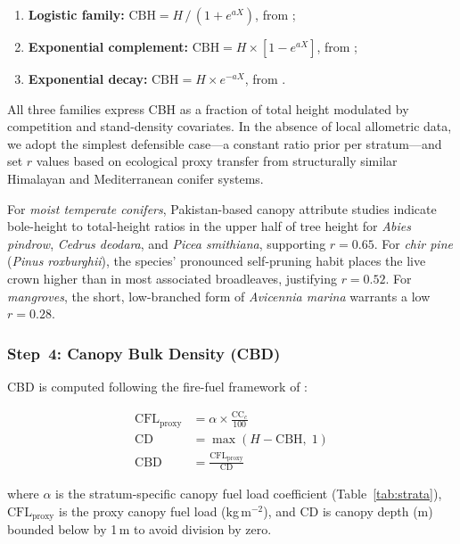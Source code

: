 \documentclass[12pt,a4paper,twoside]{article}
\newcommand{\CCc}{\text{CC}_{c}}
\newcommand{\CBH}{\text{CBH}}
\newcommand{\CBD}{\text{CBD}}
\newcommand{\CFL}{\text{CFL}}
\newcommand{\CD}{\text{CD}}
\begin{document}
\begin{enumerate}[nosep]
  \item \textbf{Logistic family:} $\CBH = H \,/\, (1 + e^{aX})$, from
    \citet{Ritchie1987};
  \item \textbf{Exponential complement:} $\CBH = H \times [1 - e^{aX}]$, from
    \citet{Wykoff1982};
  \item \textbf{Exponential decay:} $\CBH = H \times e^{-aX}$, from
    \citet{Soares2001}.
\end{enumerate}

All three families express CBH as a fraction of total height modulated by
competition and stand-density covariates.  In the absence of local allometric data,
we adopt the simplest defensible case---a constant ratio prior per stratum---and
set $r$ values based on ecological proxy transfer from structurally similar
Himalayan and Mediterranean conifer systems.

For \textit{moist temperate conifers}, Pakistan-based canopy attribute studies
\citep{AliPFI2017} indicate bole-height to total-height ratios in the upper half
of tree height for \textit{Abies pindrow}, \textit{Cedrus deodara}, and
\textit{Picea smithiana}, supporting $r = 0.65$.  For \textit{chir pine}
(\textit{Pinus roxburghii}), the species' pronounced self-pruning habit places
the live crown higher than in most associated broadleaves, justifying $r = 0.52$.
For \textit{mangroves}, the short, low-branched form of \textit{Avicennia marina}
warrants a low $r = 0.28$.

\subsubsection{Step~4: Canopy Bulk Density (CBD)}\label{sec:cbd}

CBD is computed following the fire-fuel framework of \citet{Scott2001}:

\begin{align}
  \CFL_{\text{proxy}} &= \alpha \times \frac{\CCc}{100}
    \label{eq:cfl} \\[4pt]
  \CD &= \max(H - \CBH,\; 1)
    \label{eq:cd} \\[4pt]
  \CBD &= \frac{\CFL_{\text{proxy}}}{\CD}
    \label{eq:cbd}
\end{align}

where $\alpha$ is the stratum-specific canopy fuel load coefficient
(Table~\ref{tab:strata}), $\CFL_{\text{proxy}}$ is the proxy canopy fuel load
(kg\,m$^{-2}$), and $\CD$ is canopy depth (m) bounded below by 1\,m to avoid
division by zero.
\end{document}
